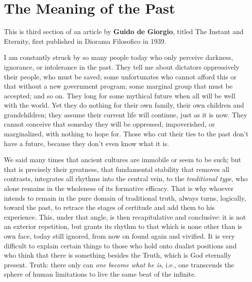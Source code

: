 \section{The Meaning of the Past}

\begin{quotex}
This is third section of an article by \textbf{Guido de Giorgio}, titled The Instant and Eternity, first published in Diorama Filosofico in 1939.

I am constantly struck by so many people today who only perceive darkness, ignorance, or intolerance in the past. They tell me about dictators oppressively their people, who must be saved; some unfortunates who cannot afford this or that without a new government program; some marginal group that must be accepted; and so on. They long for some mythical future when all will be well with the world. Yet they do nothing for their own family, their own children and grandchildren; they assume their current life will continue, just as it is now. They cannot conceive that someday they will be oppressed, impoverished, or marginalized, with nothing to hope for. Those who cut their ties to the past don't have a future, because they don't even know what it is.
\end{quotex}


We said many times that ancient cultures are immobile or seem to be such; but that is precisely their greatness, that fundamental stability that removes all contrasts, integrates all rhythms into the central vein, to the \emph{traditional type}, who alone remains in the wholeness of its formative efficacy. That is why whoever intends to remain in the pure domain of traditional truth, always turns, logically, toward the past, to retrace the stages of certitude and add them to his experience. This, under that angle, is then recapitulative and conclusive: it is not an exterior repetition, but grants its rhythm to that which is none other than is own face, today still ignored, from now on found again and vivified. It is very difficult to explain certain things to those who hold onto dualist positions and who think that there is something besides the Truth, which is God eternally present. Truth: there only can \emph{one become what he is}, i.e., one transcends the sphere of human limitations to live the same beat of the infinite.

